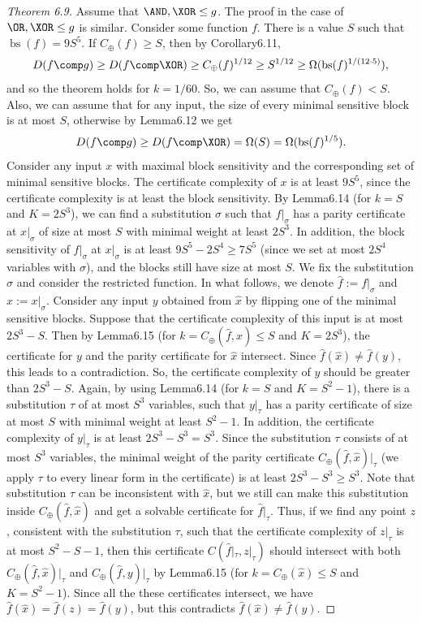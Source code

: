 \begin{proof}[Theorem 6.9]
Assume that $\AND,\XOR\le g$. The proof in the case of $\OR,\XOR\le g$ is similar. Consider some function $f$. There is a value $S$ such that $\operatorname{bs}(f)=9S^5$. If $C_\oplus(f)\ge S$, then by Corollary6.11,
\[D(f\comp g)\ge D(f\comp\XOR)\ge C_\oplus(f)^{1/12}\ge S^{1/12}\ge\Omega(\operatorname{bs}(f)^{1/(12\cdot5)}),\]
and so the theorem holds for $k=1/60$. So, we can assume that $C_\oplus(f)<S$. Also, we can assume that for any input, the size of every minimal sensitive block is at most $S$, otherwise by Lemma6.12 we get
\[D(f\comp g)\ge D(f\comp\XOR)=\Omega(S)=\Omega(\operatorname{bs}(f)^{1/5}).\]
Consider any input $x$ with maximal block sensitivity and the corresponding set of minimal sensitive blocks. The certificate complexity of $x$ is at least $9S^5$, since the certificate complexity is at least the block sensitivity. By Lemma6.14 (for $k=S$ and $K=2S^3$), we can find a substitution $\sigma$ such that $f|_\sigma$ has a parity certificate at $x|_\sigma$ of size at most $S$ with minimal weight at least $2S^3$. In addition, the block sensitivity of $f|_\sigma$ at $x|_\sigma$ is at least $9S^5-2S^4\ge7S^5$ (since we set at most $2S^4$ variables with $\sigma$), and the blocks still have size at most $S$. We fix the substitution $\sigma$ and consider the restricted function. In what follows, we denote $\hat f:=f|_\sigma$ and $\hat x:=x|_\sigma$.
Consider any input $y$ obtained from $\hat x$ by flipping one of the minimal sensitive blocks. Suppose that the certificate complexity of this input is at most $2S^3-S$. Then by Lemma6.15 (for $k=C_\oplus(\hat f,\hat x)\le S$ and $K=2S^3$), the certificate for $y$ and the parity certificate for $\hat x$ intersect. Since $\hat f(\hat x)\ne\hat f(y)$, this leads to a contradiction. So, the certificate complexity of $y$ should be greater than $2S^3-S$.
Again, by using Lemma6.14 (for $k=S$ and $K=S^2-1$), there is a substitution $\tau$ of at most $S^3$ variables, such that $y|_\tau$ has a parity certificate of size at most $S$ with minimal weight at least $S^2-1$. In addition, the certificate complexity of $y|_\tau$ is at least $2S^3-S^3=S^3$.
Since the substitution $\tau$ consists of at most $S^3$ variables, the minimal weight of the parity certificate $C_\oplus(\hat f,\hat x)|_\tau$ (we apply $\tau$ to every linear form in the certificate) is at least $2S^3-S^3\ge S^3$. Note that substitution $\tau$ can be inconsistent with $\hat x$, but we still can make this substitution inside $C_\oplus(\hat f,\hat x)$ and get a solvable certificate for $\hat f|_\tau$. Thus, if we find any point $z$, consistent with the substitution $\tau$, such that the certificate complexity of $z|_\tau$ is at most $S^2-S-1$, then this certificate $C(\hat f|_\tau,z|_\tau)$ should intersect with both $C_\oplus(\hat f,\hat x)|_\tau$ and $C_\oplus(\hat f,y)|_\tau$ by Lemma6.15 (for $k=C_\oplus(\hat x)\le S$ and $K=S^2-1$). Since all the these certificates intersect, we have $\hat f(\hat x)=\hat f(z)=\hat f(y)$, but this contradicts $\hat f(\hat x)\ne\hat f(y)$.

\end{proof}

